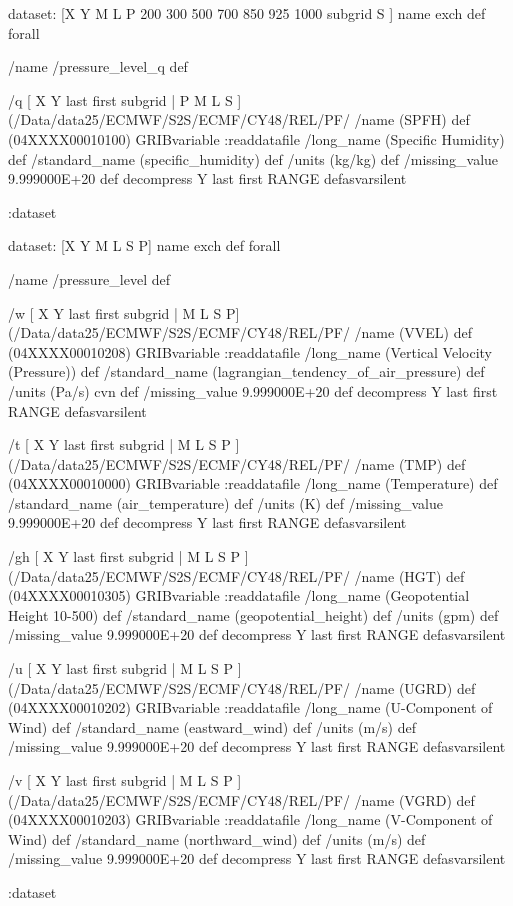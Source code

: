 \begin{ingrid}
dataset:
[X Y M L P 200 300 500 700 850 925 1000 subgrid S ] {name exch def } forall

/name /pressure_level_q def

/q { [ X Y last first subgrid | P M L S ] (/Data/data25/ECMWF/S2S/ECMF/CY48/REL/PF/%
/name (SPFH) def
(04XXXX00010100) GRIBvariable
:readdatafile
/long_name (Specific Humidity) def
/standard_name (specific_humidity) def
/units (kg/kg) def
/missing_value 9.999000E+20 def
decompress
Y last first RANGE
} defasvarsilent

:dataset


dataset:
[X Y M L S P] {name exch def } forall

/name /pressure_level def

/w { [ X Y last first subgrid | M L S P] (/Data/data25/ECMWF/S2S/ECMF/CY48/REL/PF/%
/name (VVEL) def
(04XXXX00010208) GRIBvariable
:readdatafile
/long_name (Vertical Velocity (Pressure)) def
/standard_name (lagrangian_tendency_of_air_pressure) def
/units (Pa/s) cvn def
/missing_value 9.999000E+20 def
decompress
Y last first RANGE
} defasvarsilent

/t { [ X Y last first subgrid | M L S P ]  (/Data/data25/ECMWF/S2S/ECMF/CY48/REL/PF/%
/name (TMP) def
(04XXXX00010000) GRIBvariable
:readdatafile
/long_name (Temperature) def
/standard_name (air_temperature) def
/units (K) def
/missing_value 9.999000E+20 def
decompress
Y last first RANGE
} defasvarsilent

/gh { [ X Y last first subgrid | M L S P ]  (/Data/data25/ECMWF/S2S/ECMF/CY48/REL/PF/%
/name (HGT) def
(04XXXX00010305) GRIBvariable
:readdatafile
/long_name (Geopotential Height 10-500) def
/standard_name (geopotential_height) def
/units (gpm) def
/missing_value 9.999000E+20 def
decompress
Y last first RANGE
} defasvarsilent

/u { [ X Y last first subgrid | M L S P ] (/Data/data25/ECMWF/S2S/ECMF/CY48/REL/PF/%
/name (UGRD) def
(04XXXX00010202) GRIBvariable
:readdatafile
/long_name (U-Component of Wind) def
/standard_name (eastward_wind) def
/units (m/s) def
/missing_value 9.999000E+20 def
decompress
Y last first RANGE
} defasvarsilent

/v { [ X Y last first subgrid | M L S P ] (/Data/data25/ECMWF/S2S/ECMF/CY48/REL/PF/%
/name (VGRD) def
(04XXXX00010203) GRIBvariable
:readdatafile
/long_name (V-Component of Wind) def
/standard_name (northward_wind) def
/units (m/s) def
/missing_value 9.999000E+20 def
decompress
Y last first RANGE
} defasvarsilent

:dataset

\end{ingrid}
